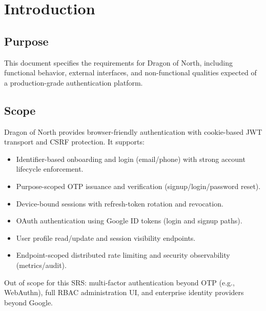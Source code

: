 \documentclass[11pt]{article}
\newcommand{\ProductName}{Dragon of North}
\begin{document}
    \tableofcontents
    \listoffigures
    \listoftables

    \newpage



    \section{Introduction}

    \subsection{Purpose}
    This document specifies the requirements for \ProductName{}, including functional behavior, external interfaces, and non-functional qualities expected of a production-grade authentication platform.

    \subsection{Scope}
    \ProductName{} provides browser-friendly authentication with cookie-based JWT transport and CSRF protection. It supports:
    \begin{itemize}
        \item Identifier-based onboarding and login (email/phone) with strong account lifecycle enforcement.
        \item Purpose-scoped OTP issuance and verification (signup/login/password reset).
        \item Device-bound sessions with refresh-token rotation and revocation.
        \item OAuth authentication using Google ID tokens (login and signup paths).
        \item User profile read/update and session visibility endpoints.
        \item Endpoint-scoped distributed rate limiting and security observability (metrics/audit).
    \end{itemize}

    Out of scope for this SRS: multi-factor authentication beyond OTP (e.g., WebAuthn), full RBAC administration UI, and enterprise identity providers beyond Google.
\end{document}
